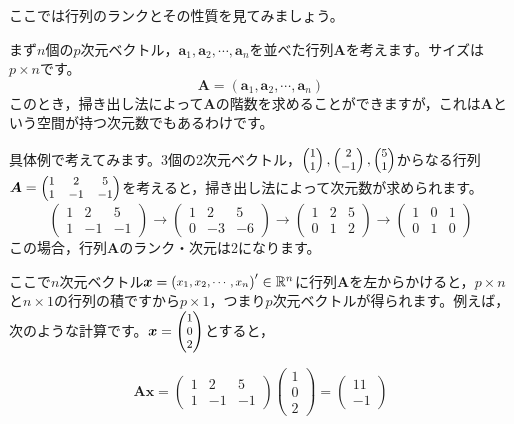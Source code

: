 \documentclass{ltjsbook}
\begin{document}
ここでは行列のランクとその性質を見てみましょう。

まず$n$個の$p$次元ベクトル，$\bm{a}_1,\bm{a}_2,\cdots,\bm{a}_n$を並べた行列$\bm{A}$を考えます。サイズは$p\times n$です。
\[ \bm{A} = (\bm{a}_1,\bm{a}_2,\cdots,\bm{a}_n)\]
このとき，掃き出し法によって$\bm{A}$の階数を求めることができますが，これは$\bm{A}$という空間が持つ次元数でもあるわけです。

具体例で考えてみます。3個の2次元ベクトル，$\footnotesize\begin{pmatrix}1\\1\end{pmatrix},\begin{pmatrix}2\\-1\end{pmatrix},\begin{pmatrix}5\\1\end{pmatrix}$からなる行列$\bm{A}=\footnotesize\begin{pmatrix}1&2&5\\1&-1&-1\end{pmatrix}$を考えると，掃き出し法によって次元数が求められます。
\[ \begin{pmatrix}1&2&5\\1&-1&-1\end{pmatrix}\to \begin{pmatrix}1&2&5\\0&-3&-6\end{pmatrix} \to
	\begin{pmatrix}1&2&5\\0&1&2\end{pmatrix}\to \begin{pmatrix}1&0&1\\0&1&0\end{pmatrix}\]
この場合，行列$\bm{A}$のランク・次元は2になります。

ここで$n$次元ベクトル$\bm{x}=\footnotesize\begin{pmatrix}x_1,x_2,\cdots,x_n\end{pmatrix}'\in \mathbb{R}^n$に行列$\bm{A}$を左からかけると，$p \times n$と$n \times 1$の行列の積ですから$p \times 1$，つまり$p$次元ベクトルが得られます。例えば，次のような計算です。$\bm{x} = \footnotesize\begin{pmatrix}1\\0\\2\end{pmatrix}$とすると，

\[ \bm{Ax} = \begin{pmatrix}1&2&5\\1&-1&-1\end{pmatrix} \begin{pmatrix}1\\0\\2\end{pmatrix}= \begin{pmatrix}11\\-1\end{pmatrix}\]
\end{document}
